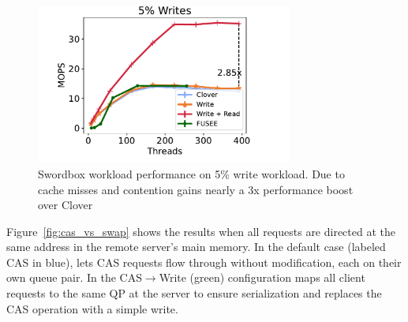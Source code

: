 \begin{figure}
    \center
    \includegraphics[width=0.75\textwidth]{fig/full_system_performance-b.pdf}
    \caption{Swordbox workload performance on 5\% write workload. Due to cache misses and contention \sword gains nearly a 3x performance boost over Clover}
    \label{fig:full_system_performance-b}
\end{figure}

Figure~\ref{fig:cas_vs_swap} shows the results when all requests are
directed at the same address in the remote server's main memory.  In
the default case (labeled CAS in blue), {\sword} lets CAS requests
flow through without modification, each on their own queue pair.  In
the CAS$\rightarrow$Write (green) configuration {\sword} maps all
client requests to the same QP at the server to ensure serialization
and replaces the CAS operation with a simple write.


